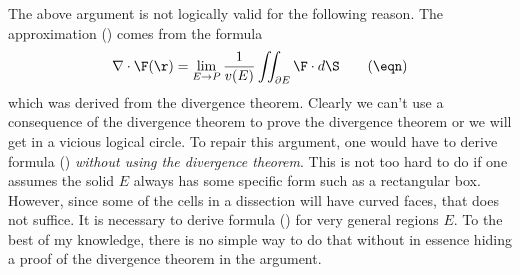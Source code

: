 The above argument is not logically valid for the following
reason.   The approximation (\eqn) comes from the formula
\nexteqn
$$
\nabla\cdot \F(\r) = \lim_{E \to P}
\frac 1 {v(E)} \iint_{\partial E} \F\cdot d\S\tag\eqn
$$
which was derived from the divergence theorem.  Clearly we can't
use a consequence of the divergence theorem to prove the divergence
theorem or we will get in a vicious logical circle.   To repair
this argument, one would have to derive formula (\eqn) {\it
without using the divergence theorem}.   This is not too hard
to do if one assumes the solid $E$ always has some specific
form such as a rectangular box.  However, since some of the
cells in a dissection will have curved faces, that does not
suffice.  It is necessary to derive formula (\eqn) for
very general regions $E$.  To the best of my knowledge,
there is no simple way to do that without in essence hiding
a proof of the divergence theorem in the argument.

